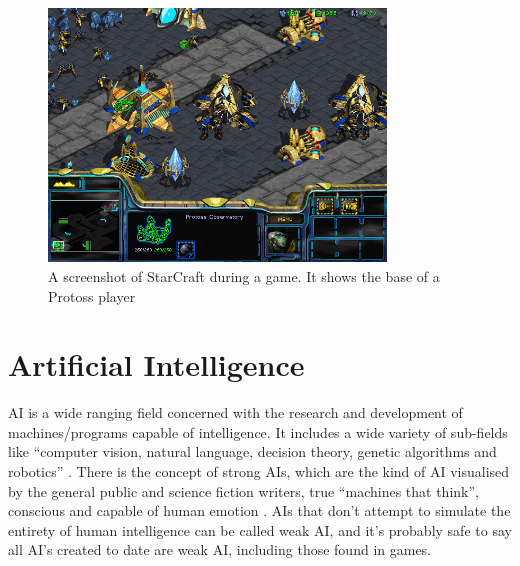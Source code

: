 \documentclass[11pt,openright,a4paper]{report}
\begin{document}
\begin{figure}[h]
    \centering
    \includegraphics[width=0.8\textwidth,natwidth=640,natheight=480]{StarCraft.png}
    \caption{A screenshot of StarCraft during a game. It shows the base of a Protoss player}
    \label{fig:StarCraft}
\end{figure}

\section{Artificial Intelligence}
AI is a wide ranging field concerned with the research and development of machines/programs capable of intelligence. It includes a wide variety of sub-fields like ``computer vision, natural language, decision theory, genetic algorithms and robotics'' \cite{mccorduck2004machines}. There is the concept of strong AIs, which are the kind of AI visualised by the general public and science fiction writers, true ``machines that think'', conscious and capable of human emotion \cite{kurzweil2005singularity}. AIs that don't attempt to simulate the entirety of human intelligence can be called weak AI, and it's probably safe to say all AI's created to date are weak AI, including those found in games.
\end{document}
